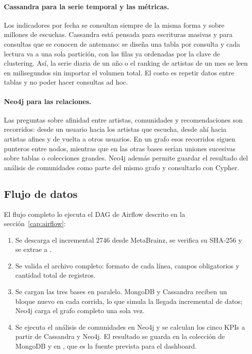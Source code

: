 \paragraph{Cassandra para la serie temporal y las métricas.} Los indicadores por fecha se consultan siempre de la misma forma y sobre millones de escuchas. Cassandra está pensada para escrituras masivas y para consultas que se conocen de antemano: se diseña una tabla por consulta y cada lectura va a una sola partición, con las filas ya ordenadas por la clave de clustering. Así, la serie diaria de un año o el ranking de artistas de un mes se leen en milisegundos sin importar el volumen total. El costo es repetir datos entre tablas y no poder hacer consultas ad hoc.

\paragraph{Neo4j para las relaciones.} Las preguntas sobre afinidad entre artistas, comunidades y recomendaciones son recorridos: desde un usuario hacia los artistas que escucha, desde ahí hacia artistas afines y de vuelta a otros usuarios. En un grafo esos recorridos siguen punteros entre nodos, mientras que en las otras bases serían uniones sucesivas sobre tablas o colecciones grandes. Neo4j además permite guardar el resultado del análisis de comunidades como parte del mismo grafo y consultarlo con Cypher.

\subsection{Flujo de datos}

El flujo completo lo ejecuta el DAG de Airflow descrito en la sección~\ref{cap:airflow}:

\begin{enumerate}
  \item Se descarga el incremental 2746 desde MetaBrainz, se verifica su SHA-256 y se extrae a .
  \item Se valida el archivo completo: formato de cada línea, campos obligatorios y cantidad total de registros.
  \item Se cargan las tres bases en paralelo. MongoDB y Cassandra reciben un bloque nuevo en cada corrida, lo que simula la llegada incremental de datos; Neo4j carga el grafo completo una sola vez.
  \item Se ejecuta el análisis de comunidades en Neo4j y se calculan los cinco KPIs a partir de Cassandra y Neo4j. El resultado se guarda en la colección  de MongoDB y en , que es la fuente prevista para el dashboard.
\end{enumerate}
